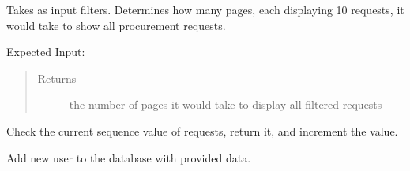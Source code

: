 \documentclass[letterpaper,10pt,english]{sphinxmanual}
\begin{document}
\begin{fulllineitems}
\begin{fulllineitems}
\label{\detokenize{apidoc/utdesign_procurement:utdesign_procurement.apigateway.ApiGateway.requestPages}}
Takes as input filters. Determines how many pages, each displaying
10 requests, it would take to show all procurement requests.

Expected Input:

\begin{sphinxVerbatim}[commandchars=\\\{\}]
     
     
\end{sphinxVerbatim}
\begin{quote}\begin{description}
\item[{Returns}] \leavevmode
the number of pages it would take to display all filtered requests

\end{description}\end{quote}

\end{fulllineitems}


\begin{fulllineitems}
\label{\detokenize{apidoc/utdesign_procurement:utdesign_procurement.apigateway.ApiGateway.sequence}}
Check the current sequence value of requests, return it,
and increment the value.

\end{fulllineitems}


\begin{fulllineitems}
\label{\detokenize{apidoc/utdesign_procurement:utdesign_procurement.apigateway.ApiGateway.userAdd}}
Add new user to the database with provided data.


\end{fulllineitems}
\end{fulllineitems}
\end{document}
